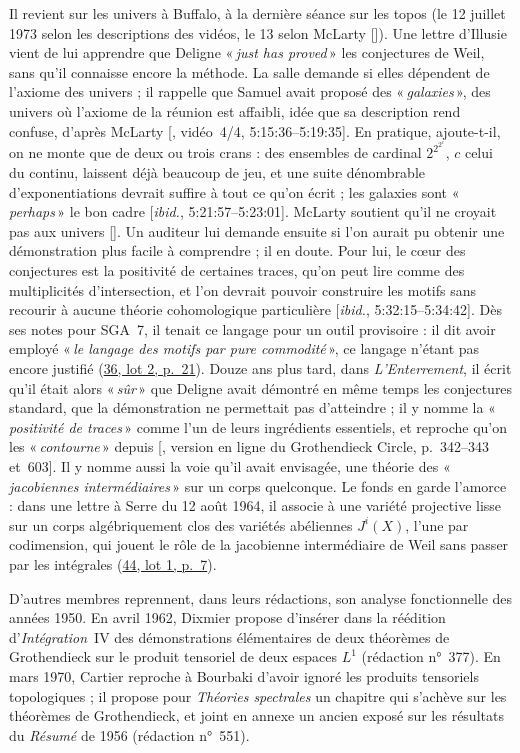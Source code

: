 \documentclass[11pt]{amsart}
\makeatletter
\newcommand{\ts}[1]{\foreignlanguage{english}{#1}}
\newcommand{\q}[1]{«\,\textit{#1}\,»}
\def\RHM@first#1--#2\@nil{#1}
\DeclareRobustCommand{\lot}[3]{\begingroup\edef\RHM@pdfpage{\the\numexpr\RHM@first#3--\@nil+1\relax}\href{https://grothendieck.umontpellier.fr/#1.pdf\#page=\RHM@pdfpage}{#1, lot #2, p.~#3}\endgroup}
\newcommand{\lot}[3]{\href{https://grothendieck.commutator.io/\##1/#2/p#3}{#1, lot #2, p.~#3}}
\makeatother
\begin{document}
Il revient sur les univers à Buffalo, à la dernière séance sur les topos (le 12 juillet 1973 selon les descriptions des vidéos, le 13 selon McLarty [\citealp{mclarty2018}]). Une lettre d'Illusie vient de lui apprendre que Deligne \q{just has proved} les conjectures de Weil, sans qu'il connaisse encore la méthode. La salle demande si elles dépendent de l'axiome des univers ; il rappelle que Samuel avait proposé des \q{galaxies}, des univers où l'axiome de la réunion est affaibli, idée que sa description rend confuse, d'après McLarty [\citealp{buffalo1973topos}, vidéo~4/4, \ts{5:15:36--5:19:35}]. En pratique, ajoute-t-il, on ne monte que de deux ou trois crans : des ensembles de cardinal $2^{2^{2^{c}}}$, $c$ celui du continu, laissent déjà beaucoup de jeu, et une suite dénombrable d'exponentiations devrait suffire à tout ce qu'on écrit ; les galaxies sont \q{perhaps} le bon cadre [\emph{ibid.}, \ts{5:21:57--5:23:01}]. McLarty soutient qu'il ne croyait pas aux univers [\citealp{mclarty2025}]. Un auditeur lui demande ensuite si l'on aurait pu obtenir une démonstration plus facile à comprendre ; il en doute. Pour lui, le cœur des conjectures est la positivité de certaines traces, qu'on peut lire comme des multiplicités d'intersection, et l'on devrait pouvoir construire les motifs sans recourir à aucune théorie cohomologique particulière [\emph{ibid.}, \ts{5:32:15--5:34:42}]. Dès ses notes pour SGA~7, il tenait ce langage pour un outil provisoire : il dit avoir employé \q{le langage des motifs par pure commodité}, ce langage n'étant pas encore justifié (\lot{36}{2}{21}). Douze ans plus tard, dans \emph{L'Enterrement}, il écrit qu'il était alors \q{sûr} que Deligne avait démontré en même temps les conjectures standard, que la démonstration ne permettait pas d'atteindre ; il y nomme la \q{positivité de traces} comme l'un de leurs ingrédients essentiels, et reproche qu'on les \q{contourne} depuis [\citealp{grothendieck2022}, version en ligne du Grothendieck Circle, p.~342--343 et~603]. Il y nomme aussi la voie qu'il avait envisagée, une théorie des \q{jacobiennes intermédiaires} sur un corps quelconque. Le fonds en garde l'amorce : dans une lettre à Serre du 12 août 1964, il associe à une variété projective lisse sur un corps algébriquement clos des variétés abéliennes $J^{i}(X)$, l'une par codimension, qui jouent le rôle de la jacobienne intermédiaire de Weil sans passer par les intégrales (\lot{44}{1}{7}).

D'autres membres reprennent, dans leurs rédactions, son analyse fonctionnelle des années 1950. En avril 1962, Dixmier propose d'insérer dans la réédition d'\emph{Intégration}~IV des démonstrations élémentaires de deux théorèmes de Grothendieck sur le produit tensoriel de deux espaces $L^1$ (rédaction n°~377). En mars 1970, Cartier reproche à Bourbaki d'avoir ignoré les produits tensoriels topologiques ; il propose pour \emph{Théories spectrales} un chapitre qui s'achève sur les théorèmes de Grothendieck, et joint en annexe un ancien exposé sur les résultats du \emph{Résumé} de 1956 (rédaction n°~551).
\end{document}
